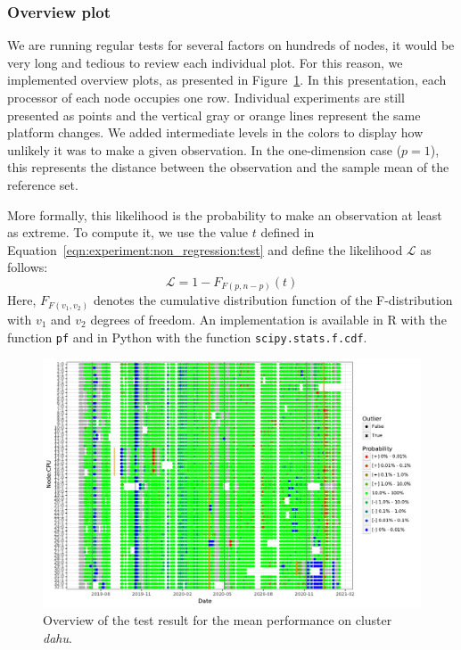             \subsubsection{Overview plot}%

                We are running regular tests for several factors on hundreds of nodes, it would be very long and tedious
                to review each individual plot. For this reason, we implemented overview plots, as presented in
                Figure~\ref{fig:experiment:non_regression:overview}. In this presentation, each processor of each node
                occupies one row. Individual experiments are still presented as points and the vertical gray or orange
                lines represent the same platform changes. We added intermediate levels in the colors to display how
                unlikely it was to make a given observation. In the one-dimension case (\ie \(p=1\)), this represents
                the distance between the observation and the sample mean of the reference set.

                More formally, this likelihood is the probability to make an observation at least as extreme. To compute
                it, we use the value \(t\) defined in Equation~\ref{eqn:experiment:non_regression:test} and define the
                likelihood \(\mathcal{L}\) as follows:
                \begin{equation}\label{eqn:experiment:non_regression:likelihood}
                    \mathcal{L} = 1-F_{F(p, n-p)}(t)
                \end{equation}
                Here, \(F_{F(v_1, v_2)}\) denotes the cumulative distribution function of the F-distribution with
                \(v_1\) and \(v_2\) degrees of freedom. An implementation is available in R with the function
                \texttt{pf} and in Python with the function
                \texttt{scipy.stats.f.cdf}.

                \begin{figure}[htpb]
                    \centering
                    \includegraphics[width=\linewidth]{img/experiment/non_regression/implementation/overview.pdf}
                    \caption{Overview of the test result for the mean performance on cluster \emph{dahu}.}%
                    \label{fig:experiment:non_regression:overview}
                \end{figure}


